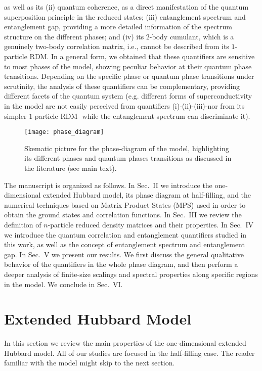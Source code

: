 \documentclass[prb,reprint,showpacs,twocolumn,superscriptaddress]{revtex4-2}
\begin{document}
as well as its (ii) quantum coherence, as a direct manifestation of the quantum superposition principle in the reduced states; 
(iii) entanglement spectrum and entanglement gap, providing a more detailed information of the spectrum structure on the different phases; 
and (iv) its $2$-body cumulant, which is a genuinely two-body correlation matrix, i.e., cannot be described from its $1$-particle RDM.
In a general form, we obtained that these quantifiers are sensitive to most phases of the model, showing peculiar behavior at their quantum phase transitions. 
Depending on the specific phase or quantum phase transitions under scrutinity, the analysis of these quantifiers can be  complementary, providing different facets of the quantum system (e.g. different forms of superconductivity in the model are not easily perceived from quantifiers (i)-(ii)-(iii)-nor from its simpler $1$-particle RDM- while the entanglement spectrum can discriminate it).

\begin{figure}
\centering
\texttt{[image: phase\_diagram]}
\caption{ Skematic picture for the phase-diagram of the model, highlighting its different phases and quantum phases transitions as discussed in the literature (see main text). }
\label{phase.diagram.ehm}
\end{figure}

The manuscript is organized as follows. In Sec.~II we introduce the one-dimensional extended Hubbard 
model, its phase diagram at half-filling, and the numerical techniques based on Matrix Product States 
(MPS) used in order to obtain the ground states and correlation functions. 
In Sec.~III we review the definition of $n$-particle reduced density matrices and their properties.
In Sec.~IV we introduce the quantum correlation and entanglement quantifiers studied in this work, 
as well as the concept of entanglement spectrum and entanglement gap.
In Sec.~V we present our results. We first discuss the general qualitative behavior of the quantifiers in the whole phase diagram, and then perform a deeper analysis of finite-size scalings and spectral properties along specific regions in the model. We conclude in Sec.~VI.

\section{Extended Hubbard Model}
\label{sec.ehm} 
 
In this section we review the main properties of the one-dimensional extended Hubbard model.  
All of our studies are focused in the half-filling case. 
The reader familiar with the model might skip to the next section.
\end{document}
